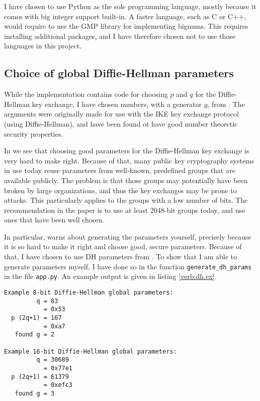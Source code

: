 \documentclass[a4paper,english,12pt]{article}
\begin{document}
I have chosen to use Python as the sole programming language, mostly because it
comes with big integer support built-in. A faster language, such as C or C++,
would require to use the GMP library \cite{wiki:gmp} for implementing bignums.
This requires installing additional packages, and I have therefore chosen not
to use those languages in this project.

\subsection{Choice of global Diffie-Hellman parameters}
While the implementation contains code for choosing $p$ and $q$ for the
Diffie-Hellman key exchange, I have chosen numbers, with a generator $g$, from
\cite{rfc3526}. The arguments were originally made for use with the IKE key
exchange protocol (using Diffie-Hellman), and have been found ot have good
number theoretic security properties.

In \cite{dh.params} we see that choosing good parameters for the Diffie-Hellman
key exchange is very hard to make right. Because of that, many public key
cryptography systems in use today reuse parameters from well-known, predefined
groups that are available publicly. The problem is that those groups may
potentially have been broken by large organizations, and thus the key exchanges
may be prone to attacks. This particularly applies to the groups with a low
number of bits. The recommendation in the paper is to use at least 2048-bit
groups today, and use ones that have been well chosen. 

In particular, \cite{dh.params} warns about generating the parameters yourself,
precisely because it is so hard to make it right and choose good, secure
parameters. Because of that, I have chosen to use DH parameters from
\cite{rfc3526}. To show that I am able to generate parameters myself, I have
done so in the function \texttt{generate\_dh\_params} in the file
\texttt{app.py}. An example output is given in listing \vref{verb:dh.ex}.

\begin{lstlisting}[caption={Finding Diffie-Hellman parameters}, label=verb:dh.ex]
Example 8-bit Diffie-Hellman global parameters:
         q = 83
           = 0x53
  p (2q+1) = 167
           = 0xa7
   found g = 2

Example 16-bit Diffie-Hellman global parameters:
         q = 30689
           = 0x77e1
  p (2q+1) = 61379
           = 0xefc3
   found g = 3
\end{lstlisting}
\end{document}
